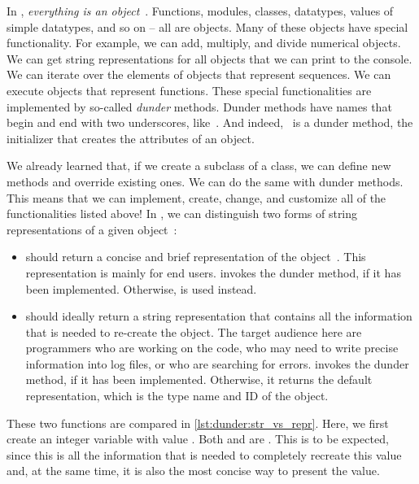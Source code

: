 %
%
In \python, \emph{everything is an object}~\cite{PSF2024OVAT,J2022PPEIAOSCD}.
Functions, modules, classes, datatypes, values of simple datatypes, and so on -- all are objects.
Many of these objects have special functionality.
For example, we can add, multiply, and divide numerical objects.
We can get string representations for all objects that we can print to the console.
We can iterate over the elements of objects that represent sequences.
We can execute objects that represent functions.
These special functionalities are implemented by so-called \emph{dunder} methods.
Dunder methods have names that begin and end with two underscores, like~.
And indeed, ~is a dunder method, the initializer that creates the attributes of an object.

We already learned that, if we create a subclass of a class, we can define new methods and override existing ones.
We can do the same with dunder methods.
This means that we can implement, create, change, and customize all of the functionalities listed above!%
%
%
%
%
%
In \python, we can distinguish two forms of string representations of a given object~:%
%
\begin{itemize}%
%
\item {} should return a concise and brief representation of the object~.
This representation is mainly for end users.
 invokes the  dunder method, if it has been implemented.
Otherwise,  is used instead.%
%
\item {} should ideally return a string representation that contains all the information that is needed to re-create the object.
The target audience here are programmers who are working on the code, who may need to write precise information into log files, or who are searching for errors.
 invokes the  dunder method, if it has been implemented.
Otherwise, it returns the default representation, which is the type name and ID of the object.%
%
\end{itemize}%
%
These two functions are compared in \cref{lst:dunder:str_vs_repr}.
Here, we first create an integer variable  with value .
Both  and  are .
This is to be expected, since this is all the information that is needed to completely recreate this value and, at the same time, it is also the most concise way to present the value.

